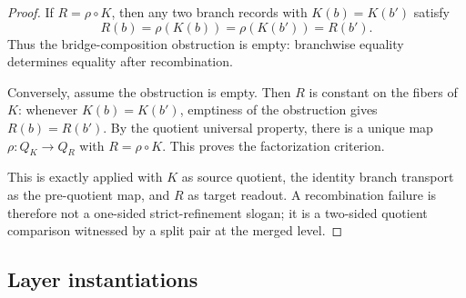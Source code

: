 \documentclass[11pt]{article}
\theoremstyle{definition}
\begin{document}
\begin{proof}
If \(R=\rho\circ K\), then any two branch records with
\(K(b)=K(b')\) satisfy
\[
  R(b)=\rho(K(b))=\rho(K(b'))=R(b').
\]
Thus the bridge-composition obstruction is empty: branchwise equality
determines equality after recombination.

Conversely, assume the obstruction is empty.  Then \(R\) is constant
on the fibers of \(K\): whenever \(K(b)=K(b')\), emptiness of the
obstruction gives \(R(b)=R(b')\).  By the quotient universal property,
there is a unique map \(\rho:Q_K\to Q_R\) with \(R=\rho\circ K\).
This proves the factorization criterion.

This is exactly  applied with \(K\) as source quotient,
the identity branch transport as the pre-quotient map, and \(R\) as
target readout.  A recombination failure is therefore not a one-sided
strict-refinement slogan; it is a two-sided quotient comparison
witnessed by a split pair at the merged level.
\end{proof}

\subsection*{Layer instantiations}\label{layer-inst:F5}
\end{document}
